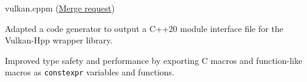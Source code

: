 \vspace{1mm}

\begin{cventries}
	{vulkan.cppm \footnotesize{(\href{https://github.com/KhronosGroup/Vulkan-Hpp/pull/1582}{Merge request})}} %
	{} %
	{} %
	{
		\begin{cvitems} %
			\item Adapted a code generator to output a C++20 module interface file for the Vulkan-Hpp wrapper library.
			\item Improved type safety and performance by exporting C macros and function-like macros as \texttt{constexpr} variables and functions.
		\end{cvitems}
	}


\end{cventries}

